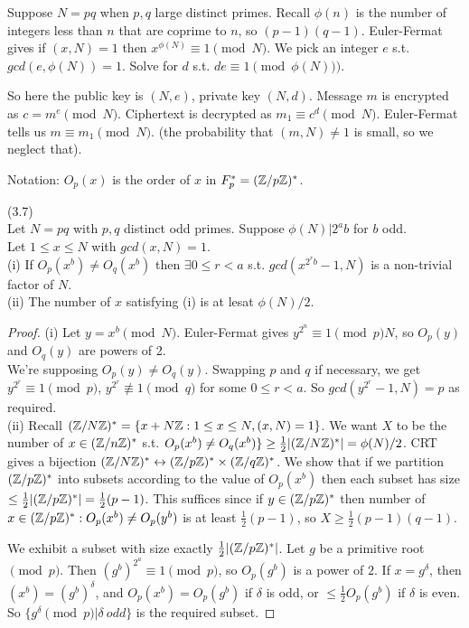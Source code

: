 \documentclass[a4paper]{article}
\begin{document}
Suppose $N=pq$ when $p,q$ large distinct primes. Recall $\phi(n)$ is the number of integers less than $n$ that are coprime to $n$, so $(p-1)(q-1)$. Euler-Fermat gives if $(x,N)=1$ then $x^{\phi(N)} \equiv 1 \pmod N$. We pick an integer $e$ s.t. $gcd(e,\phi(N))=1$. Solve for $d$ s.t. $de \equiv 1 \pmod {\phi(N))}$.

So here the public key is $(N,e)$, private key $(N,d)$. Message $m$ is encrypted as $c=m^e \pmod N$. Ciphertext is decrypted as $m_1 \equiv c^d \pmod N$. Euler-Fermat tells us $m\equiv m_1 \pmod N$. (the probability that $(m,N) \neq 1$ is small, so we neglect that).

Notation: $O_p(x)$ is the order of $x$ in $F_p^* = (\mathbb{Z}/p\mathbb{Z})^*$.

\begin{thm} (3.7)\\
Let $N=pq$ with $p,q$ distinct odd primes. Suppose $\phi(N) | 2^a b$ for $b$ odd.\\
Let $1 \leq x \leq N$ with $gcd(x,N) = 1$.\\
(i) If $O_p(x^b) \neq O_q(x^b)$ then $\exists 0 \leq r < a$ s.t. $gcd(x^{2^r b}-1,N)$ is a non-trivial factor of $N$.\\
(ii) The number of $x$ satisfying (i) is at lesat $\phi(N)/2$.
\begin{proof}
(i) Let $y=x^b \pmod N$. Euler-Fermat gives $y^{2^n} \equiv 1 \pmod p N$, so $O_p(y)$ and $O_q(y)$ are powers of 2.\\
We're supposing $O_p(y) \neq O_q(y)$. Swapping $p$ and $q$ if necessary, we get $y^{2^r} \equiv 1 \pmod p$, $y^{2^r} \not \equiv 1 \pmod q$ for some $0 \leq r < a$. So $gcd(y^{2^r}-1,N) = p$ as required.\\
(ii) Recall $(\mathbb{Z}/N\mathbb{Z})^* = \{x+N\mathbb{Z}: 1\leq x \leq N, (x,N) = 1\}$. We want $X$ to be the number of $x \in (\mathbb{Z}/n\mathbb{Z})^*$ s.t. $O_p(x^b) \neq O_q(x^b) \} \geq \frac{1}{2} |(\mathbb{Z}/N\mathbb{Z})^*| = \phi(N)/2$. CRT gives a bijection $(\mathbb{Z}/N\mathbb{Z})^* \leftrightarrow (\mathbb{Z}/p\mathbb{Z})^* \times (\mathbb{Z}/q\mathbb{Z})^*$. We show that if we partition $(\mathbb{Z}/p\mathbb{Z})^*$ into subsets according to the value of $O_p(x^b)$ then each subset has size $\leq \frac{1}{2} |(\mathbb{Z}/p\mathbb{Z})^*| = \frac{1}{2} (p-1)$. This suffices since if $y \in (\mathbb{Z}/p\mathbb{Z})^*$ then number of $x \in (\mathbb{Z}/p\mathbb{Z})^*:O_p(x^b) \neq O_p(y^b)$ is at least $\frac{1}{2} (p-1)$, so $X \geq \frac{1}{2} (p-1)(q-1)$.

We exhibit a subset with size exactly $\frac{1}{2} |(\mathbb{Z}/p\mathbb{Z})^*|$. Let $g$ be a primitive root $\pmod p$. Then $(g^b)^{2^a} \equiv 1\pmod p$, so $O_p(g^b)$ is a power of $2$. If $x=g^\delta$, then $(x^b) = (g^b)^\delta$, and $O_p(x^b) = O_p(g^b)$ if $\delta$ is odd, or $\leq \frac{1}{2} O_p(g^b)$ if $\delta$ is even. So $\{g^\delta \pmod p | \delta \ odd\}$ is the required subset.
\end{proof}
\end{thm}
\end{document}
